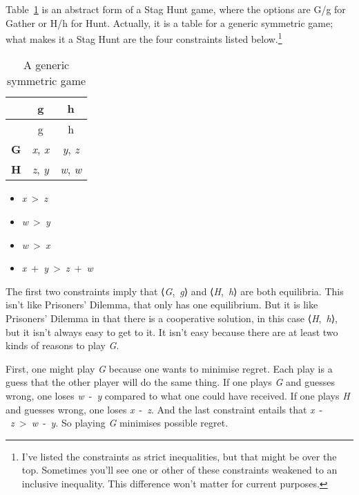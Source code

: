 \documentclass[
  11pt,
  letterpaper,
  DIV=11,
  numbers=noendperiod,
  twoside]{scrartcl}
\providecommand{\tightlist}{%
  \setlength{\itemsep}{0pt}\setlength{\parskip}{0pt}}
\begin{document}
Table~\ref{tbl-generic} is an abstract form of a Stag Hunt game, where
the options are G/g for Gather or H/h for Hunt. Actually, it is a table
for a generic symmetric game; what makes it a Stag Hunt are the four
constraints listed below.\footnote{I've listed the constraints as strict
  inequalities, but that might be over the top. Sometimes you'll see one
  or other of these constraints weakened to an inclusive inequality.
  This difference won't matter for current purposes.}

\begin{longtable}[]{@{}lcc@{}}
\caption{A generic symmetric game}\label{tbl-generic}\tabularnewline
\toprule\noalign{}
& g & h \\
\midrule\noalign{}
\endfirsthead
\toprule\noalign{}
& g & h \\
\midrule\noalign{}
\endhead
\bottomrule\noalign{}
\endlastfoot
\textbf{G} & \emph{x}, \emph{x} & \emph{y}, \emph{z} \\
\textbf{H} & \emph{z}, \emph{y} & \emph{w}, \emph{w} \\
\end{longtable}

\begin{itemize}
\tightlist
\item
  \emph{x}~\textgreater~\emph{z}
\item
  \emph{w}~\textgreater~\emph{y}
\item
  \emph{w}~\textgreater~\emph{x}
\item
  \emph{x}~+~\emph{y}~\textgreater~\emph{z}~+~\emph{w}
\end{itemize}

The first two constraints imply that ⟨\emph{G},~\emph{g}⟩ and
⟨\emph{H},~\emph{h}⟩ are both equilibria. This isn't like Prisoners'
Dilemma, that only has one equilibrium. But it is like Prisoners'
Dilemma in that there is a cooperative solution, in this case
⟨\emph{H},~\emph{h}⟩, but it isn't always easy to get to it. It isn't
easy because there are at least two kinds of reasons to play \emph{G}.

First, one might play \emph{G} because one wants to minimise regret.
Each play is a guess that the other player will do the same thing. If
one plays \emph{G} and guesses wrong, one loses \emph{w}~-~\emph{y}
compared to what one could have received. If one plays \emph{H} and
guesses wrong, one loses \emph{x}~-~\emph{z}. And the last constraint
entails that \emph{x}~-~\emph{z}~\textgreater~\emph{w}~-~\emph{y}. So
playing \emph{G} minimises possible regret.
\end{document}
